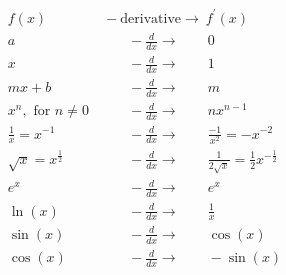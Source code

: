 		\begin{table}[htb]
			\centering
			\caption{Derivative formulas for commonly used functions}
			\vspace{-3mm}
			\begin{shadebox}%
			\vspace{-2mm}
			{ \small
			\begin{align*}
			f(x)					&  \ -\textrm{derivative}\to  \   				f^{\prime\!}(x)	\\
			a					&\qquad  - \tfrac{d}{dx} \rightarrow \qquad 		0			\\
			x					&\qquad  - \tfrac{d}{dx} \rightarrow \qquad		1			\\
			mx+b				&\qquad  - \tfrac{d}{dx} \rightarrow \qquad		m			\\
			x^n, \text{ for } n\neq 0	&\qquad  - \tfrac{d}{dx} \rightarrow \qquad 		nx^{n-1}		\\
			\tfrac{1}{x} =  x^{-1}		&\qquad  - \tfrac{d}{dx} \rightarrow \qquad 		\tfrac{-1}{x^2} = -x^{-2}	\\
			\sqrt{x} = x^{\frac{1}{2}}	&\qquad  - \tfrac{d}{dx} \rightarrow \qquad		\tfrac{1}{2\sqrt{x}} = \tfrac{1}{2}x^{-\frac{1}{2}} \\
			e^x					&\qquad  - \tfrac{d}{dx} \rightarrow \qquad 		e^x			\\
			\ln(x)					&\qquad  - \tfrac{d}{dx} \rightarrow \qquad 		\tfrac{1}{x}		\\
			\sin(x)				&\qquad  - \tfrac{d}{dx} \rightarrow \qquad 		\cos(x)		\\
			\cos(x)				&\qquad  - \tfrac{d}{dx} \rightarrow \qquad 		-\sin(x)
			\end{align*}}\vspace{-4mm}%
			\end{shadebox}
			\label{table:derivatives}
			\vspace{-6mm}
		\end{table}
